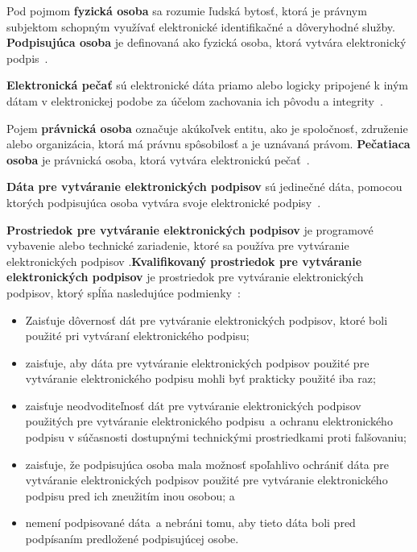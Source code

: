 \documentclass[
  digital,     %
  oneside,     %
  nosansbold,  %
  nocolorbold, %
  lof,         %
  nolot,         %
]{fithesis4}
\begin{document}
Pod pojmom \textbf{fyzická osoba} sa rozumie ľudská bytosť, ktorá je právnym subjektom schopným využívať elektronické identifikačné a dôveryhodné služby. \textbf{Podpisujúca osoba} je definovaná ako fyzická osoba, ktorá vytvára elektronický podpis~\cite[čl.~3,~odst.~9]{eidas2024}.

\textbf{Elektronická pečať} sú elektronické dáta priamo alebo logicky pripojené k iným dátam v elektronickej podobe za účelom zachovania ich pôvodu a integrity~\cite[čl.~3,~odst.~25]{eidas2024}.

Pojem \textbf{právnická osoba} označuje akúkoľvek entitu, ako je spoločnosť, združenie alebo organizácia, ktorá má právnu spôsobilosť a je uznávaná právom. \textbf{Pečatiaca osoba} je právnická osoba, ktorá vytvára elektronickú pečať~\cite[čl.~3,~odst.~9]{eidas2024}.

\textbf{Dáta pre vytváranie elektronických podpisov} sú jedinečné dáta, pomocou ktorých podpisujúca osoba vytvára svoje elektronické podpisy~\cite[čl.~3,~odst.~13]{eidas2024}.

\textbf{Prostriedok pre vytváranie elektronických podpisov} je programové vybavenie alebo technické zariadenie, ktoré sa používa pre vytváranie elektronických podpisov\cite[čl.~3,~odst.~22]{eidas2024} .\textbf{Kvalifikovaný prostriedok pre vytváranie elektronických podpisov} je prostriedok pre vytváranie elektronických podpisov, ktorý spĺňa nasledujúce podmienky~\cite[čl.~3,~odst.~23]{eidas2024}:

\begin{itemize}
  \item Zaisťuje dôvernosť dát pre vytváranie elektronických podpisov, ktoré boli použité pri vytváraní elektronického podpisu;
  \item zaisťuje, aby dáta pre vytváranie elektronických podpisov použité pre vytváranie elektronického podpisu mohli byť prakticky použité iba raz;
  \item zaisťuje neodvoditeľnosť dát pre vytváranie elektronických podpisov použitých pre vytváranie elektronického podpisu~a ochranu elektronického podpisu v súčasnosti dostupnými technickými prostriedkami proti falšovaniu;
  \item zaisťuje, že podpisujúca osoba mala možnosť spoľahlivo ochrániť dáta pre vytváranie elektronických podpisov použité pre vytváranie elektronického podpisu pred ich zneužitím inou osobou; a
  \item nemení podpisované dáta~a nebráni tomu, aby tieto dáta boli pred podpísaním predložené podpisujúcej osobe.~\cite[príloha II]{eidas2024}
\end{itemize}
\end{document}
